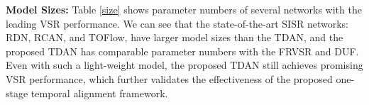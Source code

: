 \documentclass[10pt,twocolumn,letterpaper]{article}
\newcommand{\widthscalefive}{0.125}
\begin{document}
\noindent \textbf{Model Sizes:} Table \ref{size} shows parameter numbers of several networks with the leading VSR performance. We can see that the state-of-the-art SISR networks: RDN, RCAN, and TOFlow, have larger model sizes than the TDAN, and the proposed TDAN has comparable parameter numbers with the FRVSR and DUF. Even with such a light-weight model, the proposed TDAN still achieves promising VSR performance, which further validates the effectiveness of the proposed one-stage temporal alignment framework.
\end{document}
